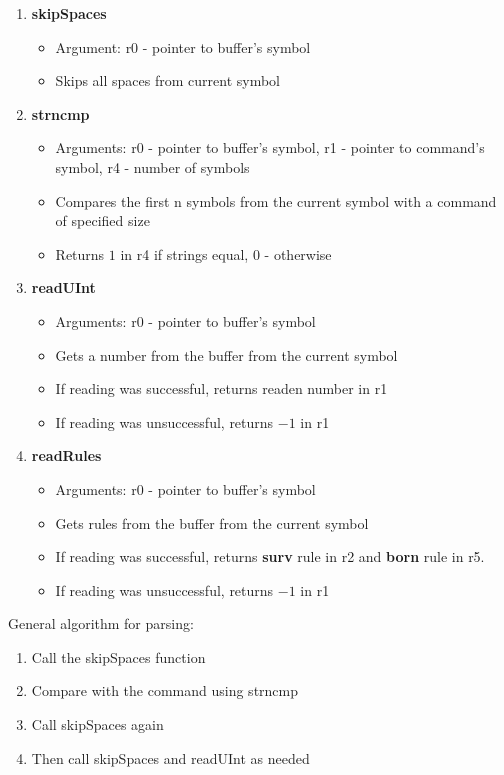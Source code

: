 \begin{enumerate}
	\item \textbf{skipSpaces}
		\begin{itemize}
			\item Argument: r0 - pointer to buffer's symbol
			\item Skips all spaces from current symbol
		\end{itemize}
	\item \textbf{strncmp}
		\begin{itemize}
			\item Arguments: r0 - pointer to buffer's symbol, r1 - pointer to command's symbol, r4 - number of symbols
			\item Compares the first n symbols from the current symbol with a command of specified size
			\item Returns $1$ in r4 if strings equal, $0$ - otherwise
		\end{itemize}
	\item \textbf{readUInt}
		\begin{itemize}
			\item Arguments: r0 - pointer to buffer's symbol
			\item Gets a number from the buffer from the current symbol
			\item If reading was successful, returns readen number in r1
			\item If reading was unsuccessful, returns $-1$ in r1
		\end{itemize}
	\item \textbf{readRules}
		\begin{itemize}
			\item Arguments: r0 - pointer to buffer's symbol
			\item Gets rules from the buffer from the current symbol
			\item If reading was successful, returns \textbf{surv} rule in r2 and \textbf{born} rule in r5.
			\item If reading was unsuccessful, returns $-1$ in r1
		\end{itemize}
\end{enumerate}

General algorithm for parsing:

\begin{enumerate}
	\item Call the skipSpaces function
	\item Compare with the command using strncmp
	\item Call skipSpaces again
	\item Then call skipSpaces and readUInt as needed
\end{enumerate}

